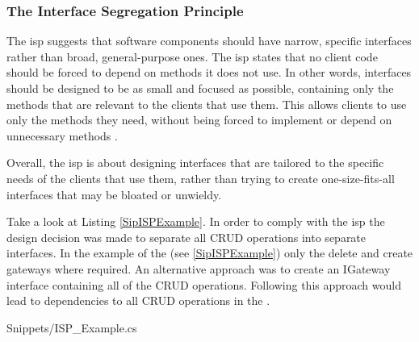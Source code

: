 \subsubsection*{The Interface Segregation Principle} \label{subsubsec:isp}

The \gls{isp} suggests that software components should have narrow, specific interfaces
rather than broad, general-purpose ones. The \gls{isp} states that no client code should
be forced to depend on methods it does not use. In other words, interfaces should be
designed to be as small and focused as possible, containing only the methods that are
relevant to the clients that use them. This allows clients to use only the methods they
need, without being forced to implement or depend on unnecessary methods
\parencite{robert_c_martin_clean_2018}.

Overall, the \gls{isp} is about designing interfaces that are tailored to the specific
needs of the clients that use them, rather than trying to create one-size-fits-all
interfaces that may be bloated or unwieldy.

Take a look at Listing \ref{SipISPExample}. In order to comply with the \gls{isp} the
design decision was made to separate all CRUD operations into separate interfaces. In
the example of the  (see \ref{SipISPExample}) only
the delete and create gateways where required. An alternative approach was to
create an IGateway interface containing all of the CRUD operations. Following this
approach would lead to dependencies to all CRUD operations in the .


    {Snippets/ISP_Example.cs}